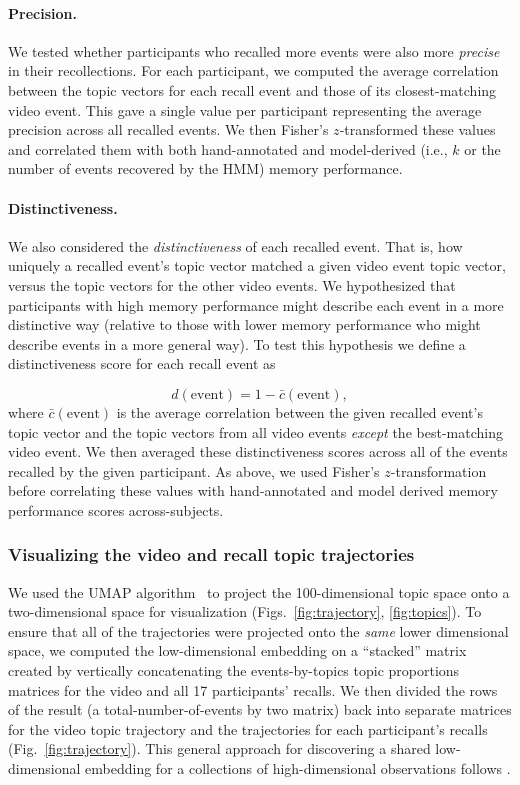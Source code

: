 \documentclass{article}
\begin{document}
\paragraph*{Precision.}
We tested whether participants who recalled more events were also more \textit{precise} in their recollections. For each participant, we computed the average correlation between the topic vectors for each recall event and those of its closest-matching video event. This gave a single value per participant representing the average precision across all recalled events.  We then Fisher's $z$-transformed these values and correlated them with both hand-annotated and model-derived (i.e., $k$ or the number of events recovered by the HMM) memory performance.

\paragraph*{Distinctiveness.}
We also considered the \textit{distinctiveness} of each recalled event. That is, how uniquely a recalled event's topic vector matched a given video event topic vector, versus the topic vectors for the other video events. We hypothesized that participants with high memory performance might describe each event in a more distinctive way (relative to those with lower memory performance who might describe events in a more general way).  To test this hypothesis we define a distinctiveness score for each recall event as

\[
  d(\mathrm{event}) = 1 - \bar{c}(\mathrm{event}),
\]
where $\bar{c}(\mathrm{event})$ is the average correlation between the given recalled event's topic vector and the topic vectors from all video events \textit{except} the best-matching video event.  We then averaged these distinctiveness scores across all of the events recalled by the given participant. As above, we used Fisher's $z$-transformation before correlating these values with hand-annotated and model derived memory performance scores across-subjects.

\subsubsection*{Visualizing the video and recall topic trajectories}
We used the UMAP algorithm~\citep{McInHeal18} to project the 100-dimensional topic space onto a two-dimensional space for visualization (Figs.~\ref{fig:trajectory}, \ref{fig:topics}).  To ensure that all of the trajectories were projected onto the \textit{same} lower dimensional space, we computed the low-dimensional embedding on a ``stacked'' matrix created by vertically concatenating the events-by-topics topic proportions matrices for the video and all 17 participants' recalls.  We then divided the rows of the result (a total-number-of-events by two matrix) back into separate matrices for the video topic trajectory and the trajectories for each participant's recalls (Fig.~\ref{fig:trajectory}).  This general approach for discovering a shared low-dimensional embedding for a collections of high-dimensional observations follows \cite{HeusEtal18a}.
\end{document}
